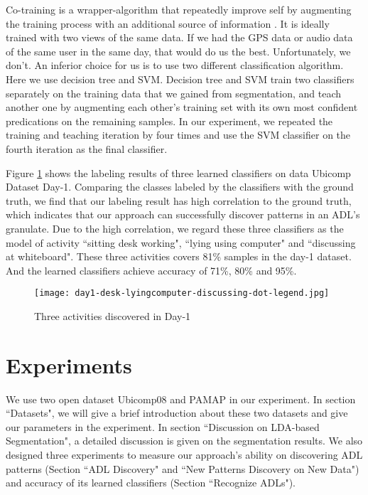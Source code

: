 \documentclass{sigchi}
\begin{document}
    Co-training is a wrapper-algorithm that repeatedly improve self by augmenting the training process with an additional source of information \cite{stikic2008exploring}.
    It is ideally trained with two views of the same data.
    If we had the GPS data or audio data of the same user in the same day, that would do us the best.
    Unfortunately, we don't.
    An inferior choice for us is to use two different classification algorithm.
    Here we use decision tree and SVM.
    Decision tree and SVM train two classifiers separately on the training data that we gained from segmentation, and teach another one by augmenting each other's training set with its own most confident predications on the remaining samples.
    In our experiment, we repeated the training and teaching iteration by four times and use the SVM classifier on the fourth iteration as the final classifier.

    Figure \ref{fig: day1-result} shows the labeling results of three learned classifiers on data Ubicomp Dataset Day-1.
    Comparing the classes labeled by the classifiers with the ground truth, we find that our labeling result has high correlation to the ground truth, which indicates that our approach can successfully discover patterns in an ADL's granulate.
    Due to the high correlation, we regard these three classifiers as the model of activity ``sitting desk working", ``lying using computer" and ``discussing at whiteboard".
    These three activities covers 81\% samples in the day-1 dataset.
    And the learned classifiers achieve accuracy of 71\%, 80\% and 95\%.

\begin{figure}
    \centering
  \texttt{[image: day1-desk-lyingcomputer-discussing-dot-legend.jpg]}
    \caption{Three activities discovered in Day-1}
    \label{fig: day1-result}
\end{figure}


\section{Experiments}
\label{sec.experiments}

    We use two open dataset Ubicomp08 and PAMAP in our experiment.
    In section ``Datasets", we will give a brief introduction about these two datasets and give our parameters in the experiment.
    In section ``Discussion on LDA-based Segmentation", a detailed discussion is given on the segmentation results.
    We also designed three experiments to measure our approach's ability on discovering ADL patterns (Section ``ADL Discovery" and ``New Patterns Discovery on New Data") and accuracy of its learned classifiers (Section ``Recognize ADLs").
\end{document}
